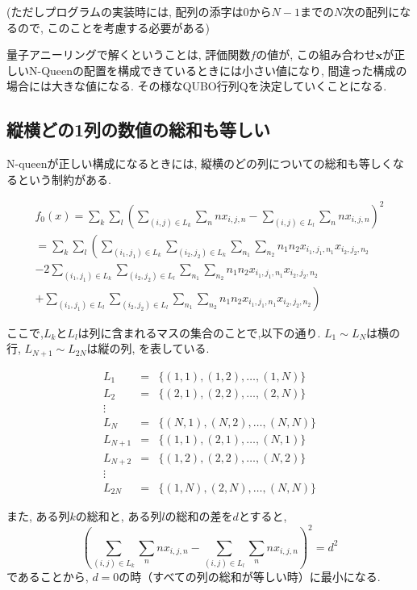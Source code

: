 \documentclass[uplatex,dvipdfmx,a4paper,11pt,oneside,openany]{jsbook}
\begin{document}
(ただしプログラムの実装時には, 配列の添字は0から$N-1$までの$N$次の配列になるので, このことを考慮する必要がある)

量子アニーリングで解くということは, 評価関数$f$の値が, この組み合わせ$\bm{x}$が正しいN-Queenの配置を構成できているときには小さい値になり, 間違った構成の場合には大きな値になる. その様なQUBO行列Qを決定していくことになる.

\subsection{縦横どの1列の数値の総和も等しい}

N-queenが正しい構成になるときには, 縦横のどの列についての総和も等しくなるという制約がある.

\begin{multline}
f_0(x)=\sum_k\sum_l\left(\sum_{(i,j)\in L_k}\sum_n n x_{i,j,n} - \sum_{(i,j)\in L_l}\sum_n n  x_{i,j,n}\right)^2\\=\sum_k\sum_l\left(\sum_{(i_1,j_1)\in L_k}\sum_{(i_2,j_2)\in L_k}\sum_{n_1}\sum_{n_2}n_1 n_2 x_{i_1,j_1,n_1}x_{i_2,j_2,n_2}\right.\\-2\sum_{(i_1,j_1)\in L_k}\sum_{(i_2,j_2)\in L_l}\sum_{n_1}\sum_{n_2} n_1 n_2 x_{i_1,j_1,n_1}x_{i_2,j_2,n_2}\\\left.
+\sum_{(i_1,j_1)\in L_l}\sum_{(i_2,j_2)\in L_l}\sum_{n_1}\sum_{n_2}n_1 n_2 x_{i_1,j_1,n_1}x_{i_2,j_2,n_2}\right) \nonumber
\end{multline}

ここで,$L_k$と$L_l$は列に含まれるマスの集合のことで,以下の通り. $L_1 \sim L_{N}$は横の行, $L_{N+1} \sim L_{2N}$は縦の列, を表している.

\begin{eqnarray*}
L_1 &=& \{(1,1),(1,2),\dots,(1,N)\}\\
L_2 &=& \{(2,1),(2,2),\dots,(2,N)\}\\
\vdots\\
L_{N} &=& \{(N,1),(N,2),\dots,(N,N)\}\\
L_{N+1} &=& \{(1,1),(2,1),\dots,(N,1)\}\\
L_{N+2} &=& \{(1,2),(2,2),\dots,(N,2)\}\\
\vdots\\
L_{2N} &=& \{(1,N),(2,N),\dots,(N,N)\}
\end{eqnarray*}

また, ある列$k$の総和と, ある列$l$の総和の差を$d$とすると,
\[
\left(\sum_{(i,j)\in L_{k}}\sum_n n x_{i,j,n} - \sum_{(i,j)\in L_{l}}\sum_n n x_{i,j,n} \right)^2 = d^2
\]
であることから, $d=0$の時（すべての列の総和が等しい時）に最小になる.
\end{document}
